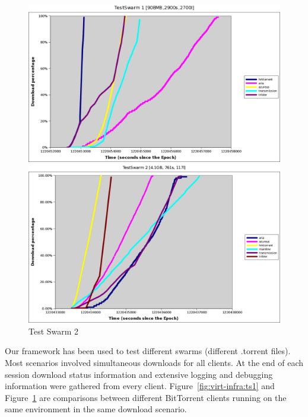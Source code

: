 \begin{figure}
  \centering
  \begin{minipage}{0.8\textwidth}
  \includegraphics[width=\textwidth]{src/img/virt-infra/test-swarm1-labels}
  \caption{Test Swarm 1}
  \label{fig:virt-infra:ts1}
  \hspace{0.2cm}
  \includegraphics[width=\textwidth]{src/img/virt-infra/test-swarm2-labels}
  \caption{Test Swarm 2}
  \label{fig:virt-infra:ts2}
  \end{minipage}
\end{figure}

Our framework has been used to test different swarms (different .torrent
files). Most scenarios involved simultaneous downloads for all clients. At the
end of each session download status information and extensive logging and
debugging information were gathered from every client.
Figure~\ref{fig:virt-infra:ts1} and Figure~\ref{fig:virt-infra:ts2} are
comparisons between different BitTorrent clients running on the same
environment in the same download scenario.

